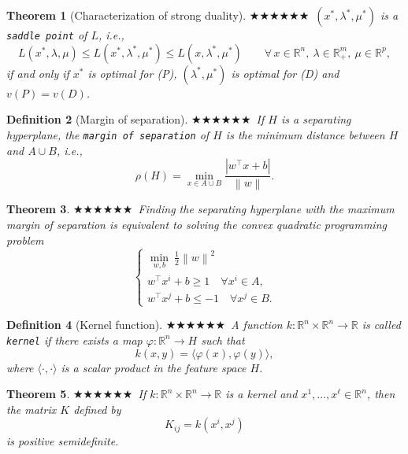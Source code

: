 \documentclass[11pt,a4paper]{article}
\newcommand{\g}{\texttt}
\newcommand{\R}{\mathbb{R}}
\newcommand{\norm}[1]{\left\lVert #1 \right\rVert}
\theoremstyle{breakdef}
\newtheorem{definition}{Definition}[section]
\theoremstyle{breakplain}
\newtheorem{theorem}[definition]{Theorem}
\theoremstyle{remark}
\newcommand{\imp}[1]{\textcolor{impcolor}{%
  \ifcase#1\or$\bigstar$\or$\bigstar\bigstar$\or$\bigstar\bigstar\bigstar$\fi}\ }
\begin{document}
\begin{theorem}[Characterization of strong duality]
    \imp{2}$(x^*, \lambda^*, \mu^*)$ is a \g{saddle point} of $L$, i.e.,
    \[
        L(x^*, \lambda, \mu) \le L(x^*, \lambda^*, \mu^*) \le L(x, \lambda^*, \mu^*) \qquad \forall\, x \in \R^n,\ \lambda \in \R^m_+,\ \mu \in \R^p,
    \]
    if and only if $x^*$ is optimal for (P), $(\lambda^*, \mu^*)$ is optimal for (D) and $v(P) = v(D)$.
\end{theorem}

\begin{definition}[Margin of separation]
    \imp{2}If $H$ is a separating hyperplane, the \g{margin of separation} of $H$ is the minimum distance between $H$ and $A \cup B$, i.e.,
    \[
        \rho(H) = \min_{x \in A \cup B} \frac{|w^\top x + b|}{\norm{w}}.
    \]
\end{definition}

\begin{theorem}
    \imp{3}Finding the separating hyperplane with the maximum margin of separation is equivalent to solving the convex quadratic programming problem
    \begin{equation}
        \begin{cases}
            \displaystyle \min_{w, b} \ \frac{1}{2} \norm{w}^2 \\
            w^\top x^i + b \ge 1 \quad \forall x^i \in A, \\
            w^\top x^j + b \le -1 \quad \forall x^j \in B.
        \end{cases}
    \end{equation}
\end{theorem}

\begin{definition}[Kernel function]
    \imp{2}A function $k \colon \R^n \times \R^n \to \R$ is called \g{kernel} if there exists a map $\varphi \colon \R^n \to H$ such that
    \[
        k(x, y) = \langle \varphi(x), \varphi(y) \rangle,
    \]
    where $\langle \cdot, \cdot \rangle$ is a scalar product in the feature space $H$.
\end{definition}

\begin{theorem}
    \imp{2}If $k \colon \R^n \times \R^n \to \R$ is a kernel and $x^1, \dots, x^\ell \in \R^n$, then the matrix $K$ defined by
    \[
        K_{ij} = k(x^i, x^j)
    \]
    is positive semidefinite.
\end{theorem}
\end{document}
